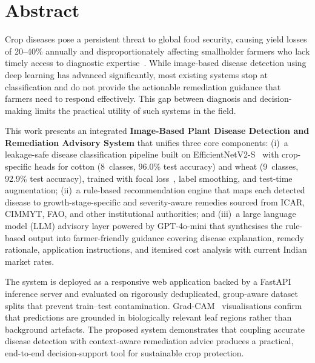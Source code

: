 \documentclass[12pt,a4paper]{report}
\begin{document}
\newpage

\chapter*{Abstract}

Crop diseases pose a persistent threat to global food security, causing yield losses of 20--40\% annually and disproportionately affecting smallholder farmers who lack timely access to diagnostic expertise~\cite{b8}. While image-based disease detection using deep learning has advanced significantly, most existing systems stop at classification and do not provide the actionable remediation guidance that farmers need to respond effectively. This gap between diagnosis and decision-making limits the practical utility of such systems in the field.

This work presents an integrated \textbf{Image-Based Plant Disease Detection and Remediation Advisory System} that unifies three core components: (i)~a leakage-safe disease classification pipeline built on EfficientNetV2-S~\cite{b1} with crop-specific heads for cotton (8~classes, 96.0\% test accuracy) and wheat (9~classes, 92.9\% test accuracy), trained with focal loss~\cite{b2}, label smoothing, and test-time augmentation; (ii)~a rule-based recommendation engine that maps each detected disease to growth-stage-specific and severity-aware remedies sourced from ICAR, CIMMYT, FAO, and other institutional authorities; and (iii)~a large language model (LLM) advisory layer powered by GPT-4o-mini that synthesises the rule-based output into farmer-friendly guidance covering disease explanation, remedy rationale, application instructions, and itemised cost analysis with current Indian market rates.

The system is deployed as a responsive web application backed by a FastAPI inference server and evaluated on rigorously deduplicated, group-aware dataset splits that prevent train--test contamination. Grad-CAM~\cite{b3} visualisations confirm that predictions are grounded in biologically relevant leaf regions rather than background artefacts. The proposed system demonstrates that coupling accurate disease detection with context-aware remediation advice produces a practical, end-to-end decision-support tool for sustainable crop protection.

\setcounter{tocdepth}{2}
\tableofcontents
\thispagestyle{plain}

\listoffigures
{}
\listoftables
{}
\newpage
\end{document}
